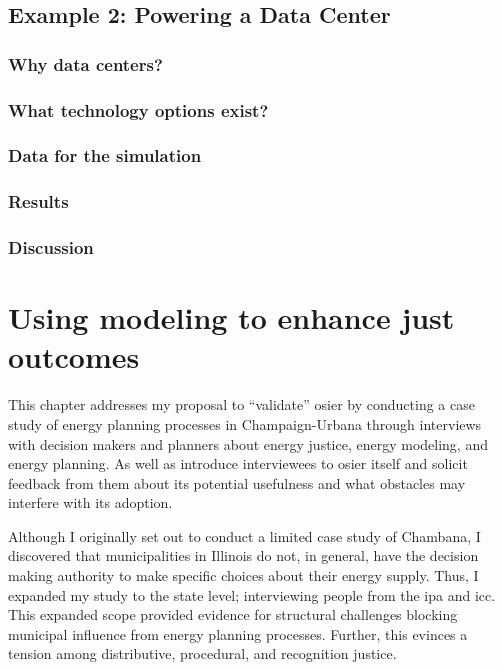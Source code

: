 \section{Example 2: Powering a Data Center}

\subsection{Why data centers?}

\subsection{What technology options exist?}

\subsection{Data for the simulation}

\subsection{Results}

\subsection{Discussion}

\chapter{Using modeling to enhance just outcomes}

This chapter addresses my proposal to ``validate'' \ac{osier} by conducting a
case study of energy planning processes in Champaign-Urbana through interviews
with decision makers and planners about energy justice, energy modeling, and
energy planning. As well as introduce interviewees to \ac{osier} itself and
solicit feedback from them about its potential usefulness and what obstacles may
interfere with its adoption. 

Although I originally set out to conduct a limited case study of Chambana, I
discovered that municipalities in Illinois do not, in general, have the decision
making authority to make specific choices about their energy supply.
Thus, I expanded my study to the state level; interviewing people from the
\ac{ipa} and \ac{icc}. This expanded scope provided evidence for structural
challenges blocking municipal influence from energy planning processes. Further,
this evinces a tension among distributive, procedural, and recognition justice.

